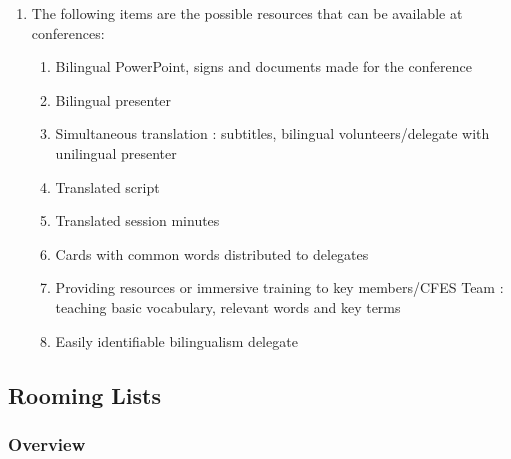 \begin{enumerate}
 \item
  The following items are the possible resources that can be available at conferences:

  \begin{enumerate}
   \item
    Bilingual PowerPoint, signs and documents made for the conference
   \item
    Bilingual presenter
   \item
    Simultaneous translation : subtitles, bilingual volunteers/delegate with unilingual presenter
   \item
    Translated script
   \item
    Translated session minutes
   \item
    Cards with common words distributed to delegates
   \item
    Providing resources or immersive training to key members/CFES Team : teaching basic vocabulary, relevant words and key terms
   \item
    Easily identifiable bilingualism delegate
  \end{enumerate}

\end{enumerate}

\subsection{Rooming Lists}
\label{rooming-lists}

\subsubsection{Overview}
\label{rooming-lists-overview}


